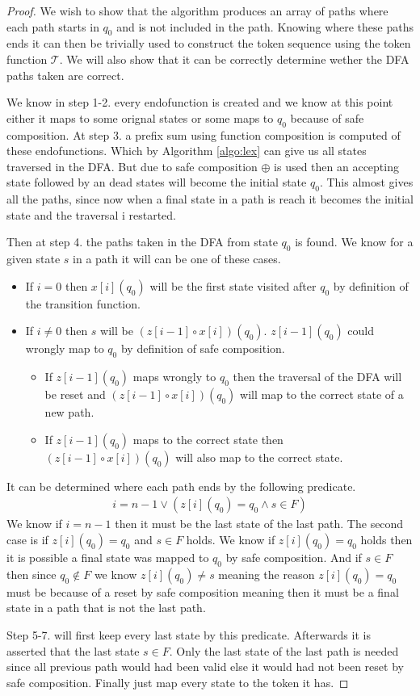 \documentclass[a4paper,12pt]{article}
\theoremstyle{definition}
\begin{document}
\begin{proof}
  We wish to show that the algorithm produces an array of paths where each path starts in $q_0$ and is not included in the path. Knowing where these paths ends it can then be trivially used to construct the token sequence using the token function $\mathcal{T}$. We will also show that it can be correctly determine wether the DFA paths taken are correct.

  We know in step 1-2. every endofunction is created and we know at this point either it maps to some orignal states or some maps to $q_0$ because of safe composition. At step 3. a prefix sum using function composition is computed of these endofunctions. Which by Algorithm \ref{algo:lex} can give us all states traversed in the DFA. But due to safe composition $\oplus$ is used then an accepting state followed by an dead states will become the initial state $q_0$. This almost gives all the paths, since now when a final state in a path is reach it becomes the initial state and the traversal i restarted.

  Then at step 4. the paths taken in the DFA from state $q_0$ is found. We know for a given state $s$ in a path it will can be one of these cases.
  \begin{itemize}
    \item If $i = 0$ then $x[i](q_0)$ will be the first state visited after $q_0$ by definition of the transition function.
    \item If $i \neq 0$ then $s$ will be $(z[i - 1] \circ x[i])(q_0)$. $z[i - 1](q_0)$ could wrongly map to $q_0$ by definition of safe composition.
    \begin{itemize}
      \item If $z[i - 1](q_0)$ maps wrongly to $q_0$ then the traversal of the DFA will be reset and $(z[i - 1] \circ x[i])(q_0)$ will map to the correct state of a new path.
      \item If $z[i - 1](q_0)$ maps to the correct state then $(z[i - 1] \circ x[i])(q_0)$ will also map to the correct state.
    \end{itemize}
  \end{itemize}
  It can be determined where each path ends by the following predicate.
  \begin{align*}
    i = n - 1 \lor (z[i](q_0) = q_0 \land s \in F)
  \end{align*}
  We know if $i = n - 1$ then it must be the last state of the last path. The second case is if $z[i](q_0) = q_0$ and $s \in F$ holds. We know if $z[i](q_0) = q_0$ holds then it is possible a final state was mapped to $q_0$ by safe composition. And if $s \in F$ then since $q_0 \notin F$ we know $z[i](q_0) \neq s$ meaning the reason $z[i](q_0) = q_0$ must be because of a reset by safe composition meaning then it must be a final state in a path that is not the last path.

  Step 5-7. will first keep every last state by this predicate. Afterwards it is asserted that the last state $s \in F$. Only the last state of the last path is needed since all previous path would had been valid else it would had not been reset by safe composition. Finally just map every state to the token it has.
\end{proof} 
\end{document}
